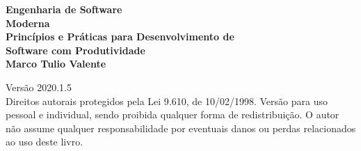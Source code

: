 \thispagestyle{empty}



\newpage
\thispagestyle{empty}
\vspace*{4cm}
\begin{center}
{\Huge \bf  Engenharia de Software\\[.3cm] Moderna}\\ 
\vspace*{1cm}
{\Large \bf  Princípios e Práticas para Desenvolvimento de\\[.3cm] Software com Produtividade}\\ 
\vspace*{3cm}
{\Large \bf Marco Tulio Valente}
\end{center}
\newpage

\newpage
\thispagestyle{empty}
\vspace*{3cm}
\begin{center}
{\Large  Versão 2020.1.5}\\ 
\vspace*{1cm}
{Direitos autorais protegidos pela Lei 9.610, de 10/02/1998. Versão para  uso pessoal e individual, sendo proibida qualquer forma de redistribuição. O autor não assume qualquer responsabilidade por eventuais danos ou perdas relacionados ao uso deste livro.}
\end{center}

\vspace*{3cm}


